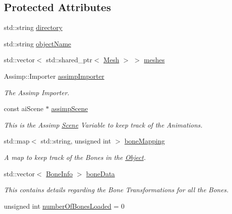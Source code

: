 \subsection*{Protected Attributes}
\begin{DoxyCompactItemize}
\item 
std\+::string \mbox{\hyperlink{classpiolot_1_1_object_ab361363059783f44a48c24529aef482e}{directory}}
\item 
std\+::string \mbox{\hyperlink{classpiolot_1_1_object_a1995f97bb181bf6aeee850052c01dd24}{object\+Name}}
\item 
std\+::vector$<$ std\+::shared\+\_\+ptr$<$ \mbox{\hyperlink{classpiolot_1_1_mesh}{Mesh}} $>$ $>$ \mbox{\hyperlink{classpiolot_1_1_object_a4a26c60e9239d03e7c31a243c0325934}{meshes}}
\item 
Assimp\+::\+Importer \mbox{\hyperlink{classpiolot_1_1_object_a5c3cdbb5520b6ff452a9d248bb359cbd}{assimp\+Importer}}
\begin{DoxyCompactList}\small\item\em The Assimp Importer. \end{DoxyCompactList}\item 
const ai\+Scene $\ast$ \mbox{\hyperlink{classpiolot_1_1_object_a169e800bae7a051cac9c2e11477a78f9}{assimp\+Scene}}
\begin{DoxyCompactList}\small\item\em This is the Assimp \mbox{\hyperlink{classpiolot_1_1_scene}{Scene}} Variable to keep track of the Animations. \end{DoxyCompactList}\item 
std\+::map$<$ std\+::string, unsigned int $>$ \mbox{\hyperlink{classpiolot_1_1_object_a7d00c3e5c9727dfd9c9937ba401470d7}{bone\+Mapping}}
\begin{DoxyCompactList}\small\item\em A map to keep track of the Bones in the \mbox{\hyperlink{classpiolot_1_1_object}{Object}}. \end{DoxyCompactList}\item 
std\+::vector$<$ \mbox{\hyperlink{structpiolot_1_1_bone_info}{Bone\+Info}} $>$ \mbox{\hyperlink{classpiolot_1_1_object_a0cab740496f8e838feb4268b36180ed7}{bone\+Data}}
\begin{DoxyCompactList}\small\item\em This contains details regarding the Bone Transformations for all the Bones. \end{DoxyCompactList}\item 
unsigned int \mbox{\hyperlink{classpiolot_1_1_object_ad0a2a51c6614bfb552ee12801643ece2}{number\+Of\+Bones\+Loaded}} = 0

\end{DoxyCompactItemize}
